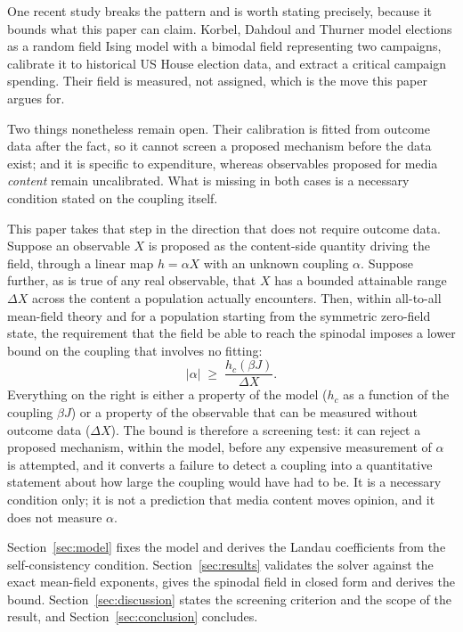 \documentclass[preprint,12pt]{elsarticle}
\begin{document}
One recent study breaks the pattern and is worth stating precisely, because it bounds what
this paper can claim. Korbel, Dahdoul and Thurner \cite{korbel2026} model elections as a random
field Ising model with a bimodal field representing two campaigns, calibrate it to historical
US House election data, and extract a critical campaign spending. Their field is measured, not
assigned, which is the move this paper argues for.

Two things nonetheless remain open. Their calibration is fitted from outcome data after the
fact, so it cannot screen a proposed mechanism before the data exist; and it is specific to
expenditure, whereas observables proposed for media \emph{content} remain uncalibrated. What
is missing in both cases is a necessary condition stated on the coupling itself.

This paper takes that step in the direction that does not require outcome data. Suppose an
observable $X$ is proposed as the content-side quantity driving the field, through a linear
map $h = \alpha X$ with an unknown coupling $\alpha$. Suppose further, as is true of any real
observable, that $X$ has a bounded attainable range $\Delta X$ across the content a
population actually encounters. Then, within all-to-all mean-field theory and for a
population starting from the symmetric zero-field state, the requirement that the field be
able to reach the spinodal imposes a lower bound on the coupling that involves no fitting:
\begin{equation}
|\alpha| \;\ge\; \frac{h_c(\beta J)}{\Delta X}.
\label{eq:bound-intro}
\end{equation}
Everything on the right is either a property of the model ($h_c$ as a function of the
coupling $\beta J$) or a property of the observable that can be measured without outcome data
($\Delta X$). The bound is therefore a screening test: it can reject a proposed mechanism,
within the model, before any expensive measurement of $\alpha$ is attempted, and it converts a
failure to detect a coupling into a quantitative statement about how large the coupling would
have had to be. It is a necessary condition only; it is not a prediction that media content
moves opinion, and it does not measure $\alpha$.

Section~\ref{sec:model} fixes the model and derives the Landau coefficients from the
self-consistency condition. Section~\ref{sec:results} validates the solver against the exact
mean-field exponents, gives the spinodal field in closed form and derives the bound.
Section~\ref{sec:discussion} states the screening criterion and the scope of the result, and
Section~\ref{sec:conclusion} concludes.
\end{document}
